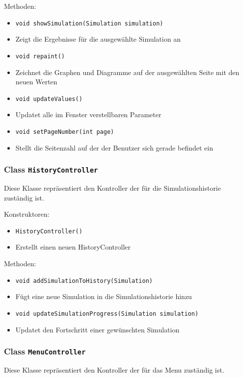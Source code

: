 \documentclass[parskip=full,11pt]{scrartcl}
\begin{document}
Methoden:
\begin{itemize}\itemsep -10pt
\item \texttt{void showSimulation(Simulation simulation)}
\item[] Zeigt die Ergebnisse für die ausgewählte Simulation an

\item \texttt{void repaint()}
\item[] Zeichnet die Graphen und Diagramme auf der ausgewählten Seite mit den neuen Werten


\item \texttt{void updateValues()}
\item[] Updatet alle im Fenster verstellbaren Parameter

\item \texttt{void setPageNumber(int page)}
\item[] Stellt die Seitenzahl auf der der Benutzer sich gerade befindet ein
\end{itemize}


\subsubsection{Class \texttt{HistoryController}}
Diese Klasse repräsentiert den Kontroller der für die Simulationshistorie zuständig ist.

Konstruktoren:
\begin{itemize}\itemsep -10pt
\item \texttt{HistoryController()}
\item[] Erstellt einen neuen HistoryController
\end{itemize}

Methoden:
\begin{itemize}\itemsep -10pt
\item \texttt{void addSimulationToHistory(Simulation)}
\item[] Fügt eine neue Simulation in die Simulationshistorie hinzu

\item \texttt{void updateSimulationProgress(Simulation simulation)}
\item[] Updatet den Fortschritt einer gewünschten Simulation
\end{itemize}

\subsubsection{Class \texttt{MenuController}}
Diese Klasse repräsentiert den Kontroller der für das Menu zuständig ist.
\end{document}
